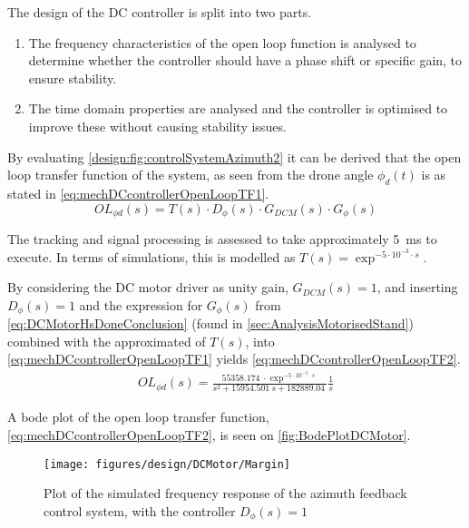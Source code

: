 The design of the DC controller is split into two parts. 
\begin{enumerate}
\item The frequency characteristics of the open loop function is analysed to determine whether the controller should have a phase shift or specific gain, to ensure stability.
\item The time domain properties are analysed and the controller is optimised to improve these without causing stability issues.
\end{enumerate}

By evaluating \autoref{design:fig:controlSystemAzimuth2} it can be derived that the open loop transfer function of the system, as seen from the drone angle $\phi_d (t)$ is as stated in \autoref{eq:mechDCcontrollerOpenLoopTF1}.
\begin{equation} \label{eq:mechDCcontrollerOpenLoopTF1} 
OL_{\phi d}(s) = T(s) \cdot D_\phi (s) \cdot G_{DCM}(s) \cdot G_\phi (s)
\end{equation}
\startexplain
{}
\stopexplain

The tracking and signal processing is assessed to take approximately \SI{5}{\milli\second} to execute. In terms of simulations, this is modelled as $T(s) = \exp^{-5 \cdot 10^{-3} \cdot s}$.

By considering the DC motor driver as unity gain, $G_{DCM}(s) = 1$, and inserting $D_\phi (s)= 1 $ and the expression for $G_\phi (s)$ from \autoref{eq:DCMotorHsDoneConclusion} (found in \autoref{sec:AnalysisMotorisedStand}) combined with the approximated of $T(s)$, into \autoref{eq:mechDCcontrollerOpenLoopTF1} yields \autoref{eq:mechDCcontrollerOpenLoopTF2}. 
\begin{align} 
OL_{\phi d}(s) = \frac{\SI{55358.174}{}\cdot \exp^{-5 \cdot 10^{-3} \cdot s}}{s^2+ \SI{15954.501}{} s +\SI{182889.04}{}} \frac{1}{s}\label{eq:mechDCcontrollerOpenLoopTF2} 
\end{align}

A bode plot of the open loop transfer function, \autoref{eq:mechDCcontrollerOpenLoopTF2}, is seen on \autoref{fig:BodePlotDCMotor}. 
\begin{figure}[h!]
	\centering
	\texttt{[image: figures/design/DCMotor/Margin]}
	\caption{Plot of the simulated frequency response of the azimuth feedback control system, with the controller $D_\phi (s) = 1$}
	\label{fig:BodePlotDCMotor}
\end{figure}

